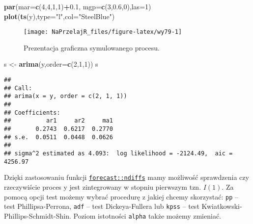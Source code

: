 \documentclass[polish,]{book}
\newenvironment{Shaded}{\begin{snugshade}}{\end{snugshade}}
\newcommand{\DataTypeTok}[1]{\textcolor[rgb]{0.13,0.29,0.53}{#1}}
\newcommand{\DecValTok}[1]{\textcolor[rgb]{0.00,0.00,0.81}{#1}}
\newcommand{\FloatTok}[1]{\textcolor[rgb]{0.00,0.00,0.81}{#1}}
\newcommand{\KeywordTok}[1]{\textcolor[rgb]{0.13,0.29,0.53}{\textbf{#1}}}
\newcommand{\NormalTok}[1]{#1}
\newcommand{\OperatorTok}[1]{\textcolor[rgb]{0.81,0.36,0.00}{\textbf{#1}}}
\newcommand{\StringTok}[1]{\textcolor[rgb]{0.31,0.60,0.02}{#1}}
\begin{document}
\begin{Shaded}
\begin{Highlighting}[]
\KeywordTok{par}\NormalTok{(}\DataTypeTok{mar=}\KeywordTok{c}\NormalTok{(}\DecValTok{4}\NormalTok{,}\DecValTok{4}\NormalTok{,}\DecValTok{1}\NormalTok{,}\DecValTok{1}\NormalTok{)}\OperatorTok{+}\FloatTok{0.1}\NormalTok{, }\DataTypeTok{mgp=}\KeywordTok{c}\NormalTok{(}\DecValTok{3}\NormalTok{,}\FloatTok{0.6}\NormalTok{,}\DecValTok{0}\NormalTok{),}\DataTypeTok{las=}\DecValTok{1}\NormalTok{)}
\KeywordTok{plot}\NormalTok{(}\KeywordTok{ts}\NormalTok{(y),}\DataTypeTok{type=}\StringTok{"l"}\NormalTok{,}\DataTypeTok{col=}\StringTok{"SteelBlue"}\NormalTok{)}
\end{Highlighting}
\end{Shaded}

\begin{figure}[h]

{\centering \texttt{[image: NaPrzelajR\_files/figure-latex/wy79-1]} 

}

\caption{Prezentacja graficzna symulowanego procesu.}\label{fig:wy79}
\end{figure}

\begin{Shaded}
\begin{Highlighting}[]
\NormalTok{s <-}\StringTok{ }\KeywordTok{arima}\NormalTok{(y,}\DataTypeTok{order=}\KeywordTok{c}\NormalTok{(}\DecValTok{2}\NormalTok{,}\DecValTok{1}\NormalTok{,}\DecValTok{1}\NormalTok{))}
\NormalTok{s}
\end{Highlighting}
\end{Shaded}

\begin{verbatim}
## 
## Call:
## arima(x = y, order = c(2, 1, 1))
## 
## Coefficients:
##          ar1     ar2     ma1
##       0.2743  0.6217  0.2770
## s.e.  0.0511  0.0448  0.0626
## 
## sigma^2 estimated as 4.093:  log likelihood = -2124.49,  aic = 4256.97
\end{verbatim}

Dzięki zastosowaniu funkcji \href{https://rdrr.io/cran/forecast/man/ndiffs.html}{\texttt{forecast::ndiffs}} mamy możliwość sprawdzenia czy rzeczywiście proces y jest zintegrowany w stopniu pierwszym tzn. \(I(1)\). Za pomocą opcji test możemy wybrać procedurę z jakiej chcemy skorzystać: \texttt{pp} -- test Phillipsa-Perrona, \texttt{adf} -- test Dickeya-Fullera lub \texttt{kpss} -- test Kwiatkowski-Phillips-Schmidt-Shin. Poziom istotności \texttt{alpha} także możemy zmieniać.
\end{document}
